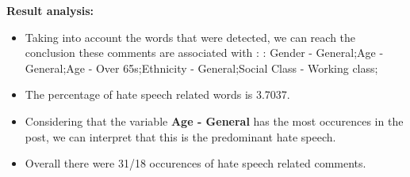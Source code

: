 \documentclass[11pt]{article}
\begin{document}
\textbf{\Large Result analysis:}

\begin{itemize}\item Taking into account the words that were detected, we can reach the conclusion these comments are associated with : : Gender - General;Age - General;Age - Over 65s;Ethnicity - General;Social Class - Working class;%

\item The percentage of hate speech related words is 3.7037.

\item Considering that the variable \textbf{Age - General} has the most occurences in the post, we can interpret that this is the predominant hate speech.

\item Overall there were 31/18 occurences of hate speech related comments.\end{itemize}
\end{document}
